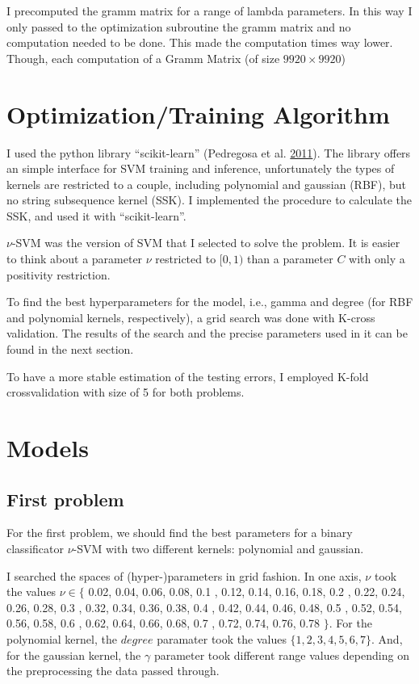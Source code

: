 \documentclass[format=acmtog]{acmart}
\begin{document}
I precomputed the gramm matrix for a range of lambda parameters. In this
way I only passed to the optimization subroutine the gramm matrix and no
computation needed to be done. This made the computation times way
lower. Though, each computation of a Gramm Matrix (of size
\(9920 \times 9920\))

\section{Optimization/Training
Algorithm}\label{optimizationtraining-algorithm}

I used the python library ``scikit-learn'' (Pedregosa et al.
\protect\hyperlink{ref-scikit-learn}{2011}). The library offers an
simple interface for SVM training and inference, unfortunately the types
of kernels are restricted to a couple, including polynomial and gaussian
(RBF), but no string subsequence kernel (SSK). I implemented the
procedure to calculate the SSK, and used it with ``scikit-learn''.

\(\nu\)-SVM was the version of SVM that I selected to solve the problem.
It is easier to think about a parameter \(\nu\) restricted to \([0,1)\)
than a parameter \(C\) with only a positivity restriction.

To find the best hyperparameters for the model, i.e., gamma and degree
(for RBF and polynomial kernels, respectively), a grid search was done
with K-cross validation. The results of the search and the precise
parameters used in it can be found in the next section.

To have a more stable estimation of the testing errors, I employed
K-fold crossvalidation with size of 5 for both problems.

\section{Models}\label{models}

\subsection{First problem}\label{first-problem-1}

For the first problem, we should find the best parameters for a binary
classificator \(\nu\)-SVM with two different kernels: polynomial and
gaussian.

I searched the spaces of (hyper-)parameters in grid fashion. In one
axis, \(\nu\) took the values \(\nu \in \{\) 0.02, 0.04, 0.06, 0.08, 0.1
, 0.12, 0.14, 0.16, 0.18, 0.2 , 0.22, 0.24, 0.26, 0.28, 0.3 , 0.32,
0.34, 0.36, 0.38, 0.4 , 0.42, 0.44, 0.46, 0.48, 0.5 , 0.52, 0.54, 0.56,
0.58, 0.6 , 0.62, 0.64, 0.66, 0.68, 0.7 , 0.72, 0.74, 0.76, 0.78 \(\}\).
For the polynomial kernel, the \(degree\) paramater took the values
\(\{1, 2, 3, 4, 5, 6, 7\}\). And, for the gaussian kernel, the
\(\gamma\) parameter took different range values depending on the
preprocessing the data passed through.
\end{document}

